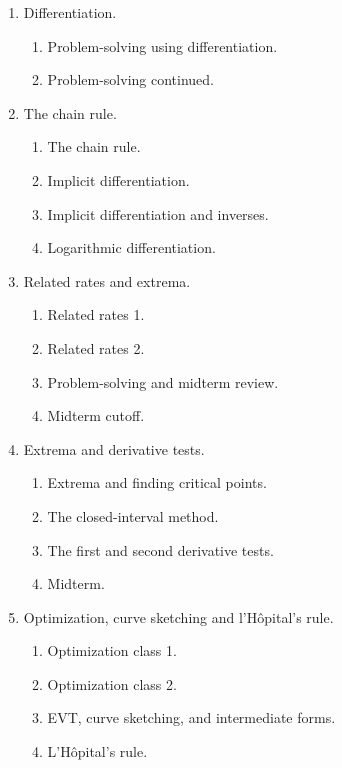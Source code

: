 \documentclass[../main.tex]{subfiles}
\begin{document}
\begin{multicols}{2}
\begin{enumerate}[wide, label={\textbf{Week \arabic*}.}]
    \item Differentiation.
      \begin{enumerate}[resume]
        \item Problem-solving using differentiation. 
        \item Problem-solving continued.
      \end{enumerate}

    \item The chain rule.
      \begin{enumerate}[resume]
        \item The chain rule.
        \item Implicit differentiation.
        \item Implicit differentiation and inverses.
        \item Logarithmic differentiation.  
      \end{enumerate}

    \item Related rates and extrema.
      \begin{enumerate}[resume]
        \item Related rates 1.
        \item Related rates 2.
        \item Problem-solving and midterm review.
        \item[\faStar{}] Midterm cutoff.
      \end{enumerate}
      \columnbreak

    \item Extrema and derivative tests.
      \begin{enumerate}[resume]
        \item Extrema and finding critical points. 
        \item The closed-interval method.
        \item The first and second derivative tests.
        \item[\faStar{}] Midterm.
      \end{enumerate}

    \item Optimization, curve sketching and l'H\^opital's rule.
      \begin{enumerate}[resume]
        \item Optimization class 1.
        \item Optimization class 2.
        \item EVT, curve sketching, and intermediate forms.
        \item L'H\^opital's rule.
      \end{enumerate}


\end{enumerate}
\end{multicols}
\end{document}
